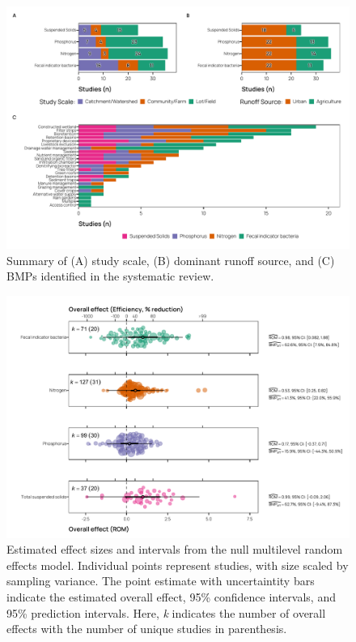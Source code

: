 \documentclass[utf8]{FrontiersinHarvard}
\begin{document}
\begin{figure}
\includegraphics[width=1\linewidth,]{../figures/bmp_summary} \caption{Summary of (A) study scale, (B) dominant runoff source, and (C) BMPs identified in the systematic review.}\label{fig:bmpsummary}
\end{figure}

\begin{figure}[H]
\includegraphics[width=1\linewidth,]{../figures/overall_effect} \caption{Estimated effect sizes and intervals from the null multilevel random effects model. Individual points represent studies, with size scaled by sampling variance. The point estimate with uncertaintity bars indicate the estimated overall effect, 95\% confidence intervals, and 95\% prediction intervals. Here, \textit{k} indicates the number of overall effects with the number of unique studies in parenthesis.}\label{fig:overalleffect}
\end{figure}
\end{document}
